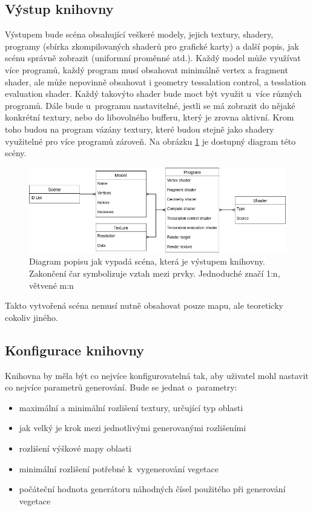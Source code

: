 \subsection*{Výstup knihovny}
Výstupem bude scéna obsahující veškeré modely, jejich textury, shadery, programy (sbírka zkompilovaných shaderů pro grafické karty) a další popis, jak scénu správně zobrazit (uniformní proměnné atd.). Každý model může využívat více programů, každý program musí obsahovat minimálně vertex a fragment shader, ale může nepovinně obsahovat i geometry tessalation control, a tesslation evaluation shader. Každý takovýto shader bude moct být využit u~více různých programů. Dále bude u~programu nastavitelné, jestli se má zobrazit do nějaké konkrétní textury, nebo do libovolného bufferu, který je zrovna aktivní. Krom toho budou na program vázány textury, které budou stejně jako shadery využitelné pro více programů zároveň. Na obrázku \ref{out-dia} je dostupný diagram této scény.
\begin{figure}[H]
	\centering
	\includegraphics[width=38em]{images/navrh/scene_diagram.png}
	\caption[caption]{Diagram popisu jak vypadá scéna, která je výstupem knihovny. Zakončení čar symbolizuje vztah mezi prvky. Jednoduché značí 1:n, větvené m:n} 
	\label{out-dia}
\end{figure}

Takto vytvořená scéna nemusí nutně obsahovat pouze mapu, ale teoreticky cokoliv jiného.

\subsection*{Konfigurace knihovny}
Knihovna by měla být co nejvíce konfigurovatelná tak, aby uživatel mohl nastavit co nejvíce parametrů generování. Bude se jednat o~parametry:

\begin{itemize}
    \item maximální a minimální rozlišení textury, určující typ oblasti
    \item jak velký je krok mezi jednotlivými generovanými rozlišeními
    \item rozlišení výškové mapy oblasti
    \item minimální rozlišení potřebné k~vygenerování vegetace
    \item počáteční hodnota generátoru náhodných čísel použitého při generování vegetace
\end{itemize}

